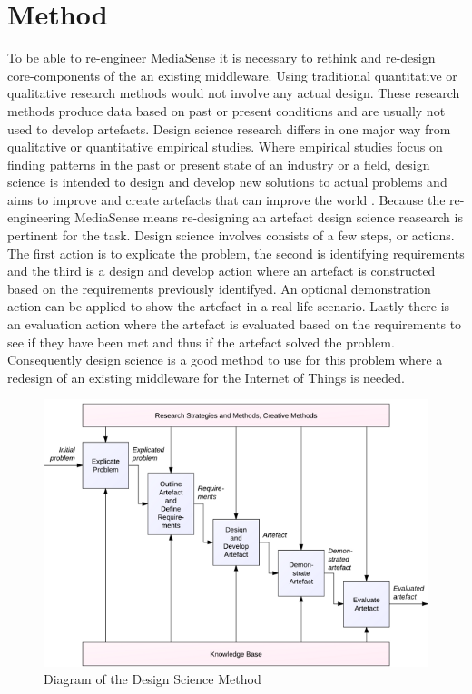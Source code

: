 \chapter{Method}
To be able to re-engineer MediaSense it is necessary to rethink and re-design core-components of the an existing middleware. Using traditional quantitative or qualitative research methods would not involve any actual design. These research methods produce data based on past or present conditions and are usually not used to develop artefacts.
Design science research differs in one major way from qualitative or quantitative empirical studies. Where empirical studies focus on finding patterns in the past or present state of an industry or a field, design science is intended to design and develop new solutions to actual problems \cite{bider2012design} and aims to improve and create artefacts that can improve the world \cite{johannesson2012design}. Because the re-engineering MediaSense means re-designing an artefact design science reasearch is pertinent for the task.
Design science involves consists of a few steps, or actions. The first action is to explicate the problem, the second is identifying requirements and the third is a design and develop action where an artefact is constructed based on the requirements previously identifyed. An optional demonstration action can be applied to show the artefact in a real life scenario. Lastly there is an evaluation action where the artefact is evaluated based on the requirements to see if they have been met and thus if the artefact solved the problem. Consequently design science is a good method to use for this problem where a redesign of an existing middleware for the Internet of Things is needed.

\begin{figure}[h!]
	\centering
    	\includegraphics[scale=0.50]{part_3/design_science.png}
		\caption{Diagram of the Design Science Method \cite{johannesson2012design}} 
		\label{ds}
\end{figure}

